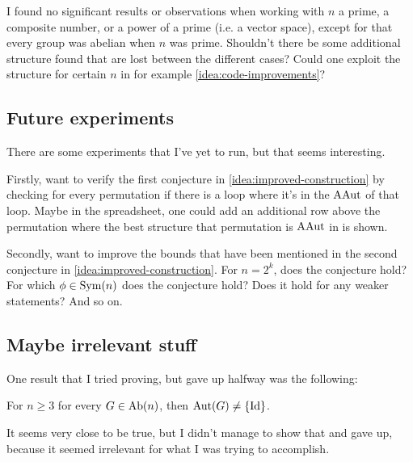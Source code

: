 \begin{idea}
    I found no significant results or observations when working with \( n \) a prime, a composite number, or a power of a prime (i.e. a vector space), except for that every group was abelian when \( n \) was prime. Shouldn't there be some additional structure found that are lost between the different cases? Could one exploit the structure for certain \( n \) in for example \autoref{idea:code-improvements}?
\end{idea}

\subsection{Future experiments}

There are some experiments that I've yet to run, but that seems interesting.

\begin{idea}
    Firstly, want to verify the first conjecture in \autoref{idea:improved-construction} by checking for every permutation if there is a loop where it's in the \( \operatorname{AAut} \) of that loop. Maybe in the spreadsheet, one could add an additional row above the permutation where the best structure that permutation is \( \operatorname{AAut} \) in is shown.
\end{idea}

\begin{idea}
    Secondly, want to improve the bounds that have been mentioned in the second conjecture in \autoref{idea:improved-construction}. For \( n = 2^k \), does the conjecture hold? For which \( \phi \in \operatorname{Sym}(n) \) does the conjecture hold? Does it hold for any weaker statements? And so on.
\end{idea}

\subsection{Maybe irrelevant stuff}

\begin{idea}
    One result that I tried proving, but gave up halfway was the following:

    For \( n \geq 3 \) for every \( G \in \operatorname{Ab}(n) \), then \( \operatorname{Aut}(G) \neq \left\{ \operatorname{Id} \right\} \). 
    
    It seems very close to be true, but I didn't manage to show that and gave up, because it seemed irrelevant for what I was trying to accomplish.
\end{idea}